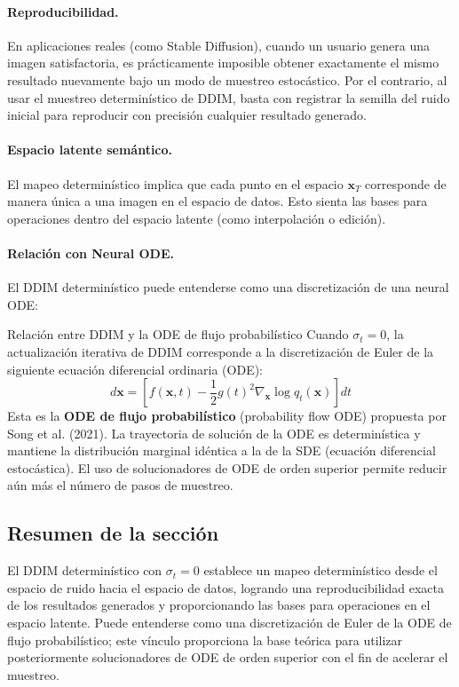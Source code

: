 \paragraph{Reproducibilidad.} En aplicaciones reales (como Stable Diffusion), cuando un usuario genera una imagen satisfactoria, es prácticamente imposible obtener exactamente el mismo resultado nuevamente bajo un modo de muestreo estocástico. Por el contrario, al usar el muestreo determinístico de DDIM, basta con registrar la semilla del ruido inicial para reproducir con precisión cualquier resultado generado.

\paragraph{Espacio latente semántico.} El mapeo determinístico implica que cada punto en el espacio $\mathbf{x}_T$ corresponde de manera única a una imagen en el espacio de datos. Esto sienta las bases para operaciones dentro del espacio latente (como interpolación o edición).

\paragraph{Relación con Neural ODE.} El DDIM determinístico puede entenderse como una discretización de una neural ODE:

\begin{knowledgebox}{Relación entre DDIM y la ODE de flujo probabilístico}
Cuando $\sigma_t = 0$, la actualización iterativa de DDIM corresponde a la discretización de Euler de la siguiente ecuación diferencial ordinaria (ODE):
$$
d\mathbf{x} = \left[f(\mathbf{x}, t) - \frac{1}{2}g(t)^2 \nabla_\mathbf{x} \log q_t(\mathbf{x})\right] dt
$$
Esta es la \textbf{ODE de flujo probabilístico} (probability flow ODE) propuesta por Song et al. (2021). La trayectoria de solución de la ODE es determinística y mantiene la distribución marginal idéntica a la de la SDE (ecuación diferencial estocástica). El uso de solucionadores de ODE de orden superior permite reducir aún más el número de pasos de muestreo.
\end{knowledgebox}

\subsection{Resumen de la sección}

El DDIM determinístico con $\sigma_t=0$ establece un mapeo determinístico desde el espacio de ruido hacia el espacio de datos, logrando una reproducibilidad exacta de los resultados generados y proporcionando las bases para operaciones en el espacio latente. Puede entenderse como una discretización de Euler de la ODE de flujo probabilístico; este vínculo proporciona la base teórica para utilizar posteriormente solucionadores de ODE de orden superior con el fin de acelerar el muestreo.

